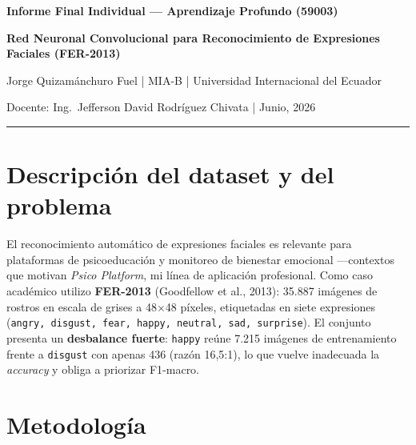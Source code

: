 \documentclass[11pt,a4paper]{article}
\begin{document}
\begin{center}
{\Large\bfseries\sffamily\color{accent} Informe Final Individual --- Aprendizaje Profundo (59003)\par}
\vspace{0.4em}
{\large\bfseries Red Neuronal Convolucional para Reconocimiento de Expresiones Faciales (FER-2013)\par}
\vspace{0.6em}
{\normalsize Jorge Quizamánchuro Fuel \quad | \quad MIA-B \quad | \quad Universidad Internacional del Ecuador\par}
{\footnotesize Docente: Ing.\ Jefferson David Rodríguez Chivata \quad | \quad Junio, 2026\par}
\end{center}

\rule{\textwidth}{0.4pt}

\section{Descripción del dataset y del problema}

El reconocimiento automático de expresiones faciales es relevante para plataformas de psicoeducación y monitoreo de bienestar emocional —contextos que motivan \emph{Psico Platform}, mi línea de aplicación profesional. Como caso académico utilizo \textbf{FER-2013} (Goodfellow et al., 2013): 35.887 imágenes de rostros en escala de grises a 48$\times$48 píxeles, etiquetadas en siete expresiones (\texttt{angry, disgust, fear, happy, neutral, sad, surprise}). El conjunto presenta un \textbf{desbalance fuerte}: \texttt{happy} reúne 7.215 imágenes de entrenamiento frente a \texttt{disgust} con apenas 436 (razón 16{,}5:1), lo que vuelve inadecuada la \emph{accuracy} y obliga a priorizar F1-macro.

\section{Metodología}
\end{document}
